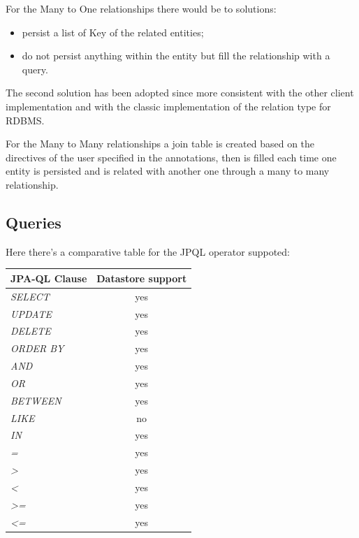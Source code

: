 For the Many to One relationships there would be to solutions:
\begin{itemize}
\item persist a list of Key of the related entities;
\item do not persist anything within the entity but fill the relationship with a query.
\end{itemize}
The second solution has been adopted since more consistent with the other client implementation and with the classic implementation of the relation type for RDBMS.

For the Many to Many relationships a join table is created based on the directives of the user specified in the annotations, then is filled each time one entity is persisted and is related with another one through a many to many relationship.

\subsection{Queries}
Here there's a comparative table for the JPQL operator suppoted:
\begin{table}[h]
\begin{tabular}{|l|c|}
\hline
\textbf{JPA-QL Clause} & \textbf{Datastore support} \\ \hline\hline
\textit{SELECT}        & yes \\ \hline
\textit{UPDATE}        & yes \\ \hline
\textit{DELETE}        & yes \\ \hline
\textit{ORDER BY}      & yes \\ \hline
\textit{AND}           & yes \\ \hline
\textit{OR}            & yes \\ \hline
\textit{BETWEEN}       & yes \\ \hline
\textit{LIKE}          & no  \\ \hline
\textit{IN}            & yes  \\ \hline
\textit{=}             & yes \\ \hline
\textit{\textgreater}  & yes \\ \hline
\textit{\textless}     & yes \\ \hline
\textit{\textgreater=} & yes \\ \hline
\textit{\textless=}    & yes \\ \hline
\end{tabular}
\end{table}

